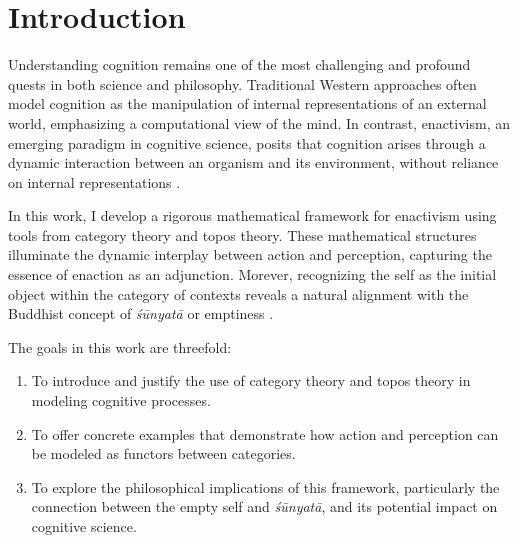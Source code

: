 \documentclass{article}
\begin{document}
\newpage




\tableofcontents

\section{Introduction}

Understanding cognition remains one of the most challenging and profound quests in both science and philosophy. Traditional Western approaches often model cognition as the manipulation of internal representations of an external world, emphasizing a computational view of the mind. In contrast, enactivism, an emerging paradigm in cognitive science, posits that cognition arises through a dynamic interaction between an organism and its environment, without reliance on internal representations \cite{varela1991}.

In this work, I develop a rigorous mathematical framework for enactivism using tools from category theory and topos theory. These mathematical structures illuminate the dynamic interplay between action and perception, capturing the essence of enaction as an adjunction. Morever, recognizing the self as the initial object within the category of contexts reveals a natural alignment with the Buddhist concept of \emph{śūnyatā} or emptiness \cite{garfield1995}.

The goals in this work are threefold:
\begin{enumerate}
    \item To introduce and justify the use of category theory and topos theory in modeling cognitive processes.
    \item To offer concrete examples that demonstrate how action and perception can be modeled as functors between categories.
    \item To explore the philosophical implications of this framework, particularly the connection between the empty self and \emph{śūnyatā}, and its potential impact on cognitive science.

\end{enumerate}
\end{document}
